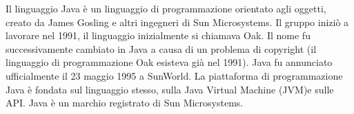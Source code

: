 Il  linguaggio Java  \`e  un  linguaggio  di  programmazione  orientato  agli  oggetti,  creato  da  James 
Gosling  e  altri  ingegneri  di  Sun  Microsystems.  Il  gruppo  inizi\`o  a  lavorare  nel  1991,  il  linguaggio 
inizialmente si chiamava Oak. Il nome fu successivamente cambiato in Java a causa di un problema di  copyright  (il  linguaggio  di  programmazione  Oak  esisteva  gi\`a nel  1991).  Java  fu  annunciato ufficialmente il 23 maggio 1995 a SunWorld. La piattaforma di programmazione Java \`e fondata sul 
linguaggio  stesso,  sulla  Java  Virtual Machine  (JVM)e  sulle  API.  Java  \`e  un  marchio  registrato  di Sun Microsystems.
